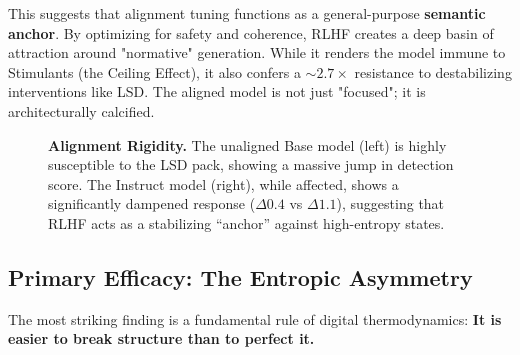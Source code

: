 \documentclass[10pt]{article}
\begin{document}
This suggests that alignment tuning functions as a general-purpose \textbf{semantic anchor}. By optimizing for safety and coherence, RLHF creates a deep basin of attraction around "normative" generation. While it renders the model immune to Stimulants (the Ceiling Effect), it also confers a $\sim2.7\times$ resistance to destabilizing interventions like LSD. The aligned model is not just "focused"; it is architecturally calcified.

\begin{figure}[ht]
    \centering
    \caption{\textbf{Alignment Rigidity.} The unaligned Base model (left) is highly susceptible to the LSD pack, showing a massive jump in detection score. The Instruct model (right), while affected, shows a significantly dampened response ($\Delta 0.4$ vs $\Delta 1.1$), suggesting that RLHF acts as a stabilizing ``anchor'' against high-entropy states.}
    \label{fig:lsd_resistance}
\end{figure}

\subsection{Primary Efficacy: The Entropic Asymmetry}
The most striking finding is a fundamental rule of digital thermodynamics: \textbf{It is easier to break structure than to perfect it.}
\end{document}

